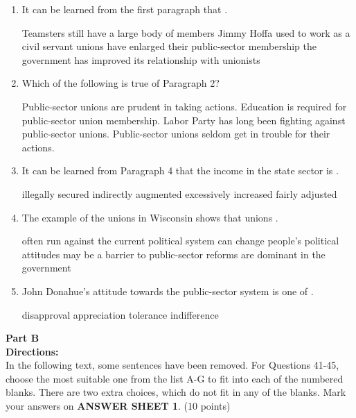 \begin{enumerate}[resume]
	\item
 It can be learned from the first paragraph that \lineread.


\fourchoices
{Teamsters still have a large body of members}
{Jimmy Hoffa used to work as a civil servant}
{unions have enlarged their public-sector membership}
{the government has improved its relationship with unionists}



\item
Which of the following is true of Paragraph 2?


\fourchoices
{Public-sector unions are prudent in taking actions.}
{Education is required for public-sector union membership.}
{Labor Party has long been fighting against public-sector unions.}
{Public-sector unions seldom get in trouble for their actions.}



\item
It can be learned from Paragraph 4 that the income in the
state sector is \lineread.


\fourchoices
{illegally secured}
{indirectly augmented}
{excessively increased}
{fairly adjusted}



\item
The example of the unions in Wisconsin shows that unions \lineread.


\fourchoices
{often run against the current political system}
{can change people's political attitudes}
{may be a barrier to public-sector reforms}
{are dominant in the government}


\item
John Donahue's attitude towards the public-sector system is
one of \lineread.


\fourchoices
{disapproval}
{appreciation}
{tolerance}
{indifference}


	
\end{enumerate}


\newpage
\noindent
\textbf{Part B}\\
\textbf{Directions:}\\
In the following text, some sentences have been removed. For
	Questions 41-45, choose the most suitable one from the list A-G to fit
	into each of the numbered blanks. There are two extra choices, which do
	not fit in any of the blanks. Mark your answers on \textbf{ANSWER SHEET 1}. (10
	points)



